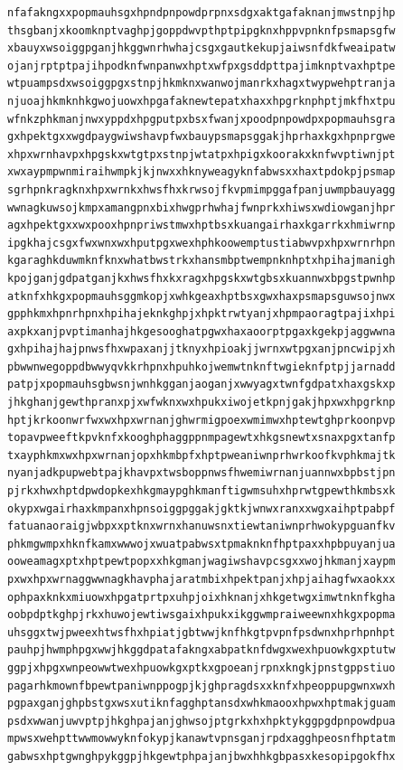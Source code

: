 \documentclass[11pt,letterpaper]{exam}
\begin{document}
\begin{questions}
\begin{verbatim}
nfafakngxxpopmauhsgxhpndpnpowdprpnxsdgxaktgafaknanjmwstnpjhp
thsgbanjxkoomknptvaghpjgoppdwvpthptpipgknxhppvpnknfpsmapsgfw
xbauyxwsoiggpganjhkggwnrhwhajcsgxgautkekupjaiwsnfdkfweaipatw
ojanjrptptpajihpodknfwnpanwxhptxwfpxgsddpttpajimknptvaxhptpe
wtpuampsdxwsoiggpgxstnpjhkmknxwanwojmanrkxhagxtwypwehptranja
njuoajhkmknhkgwojuowxhpgafaknewtepatxhaxxhpgrknphptjmkfhxtpu
wfnkzphkmanjnwxyppdxhpgputpxbsxfwanjxpoodpnpowdpxpopmauhsgra
gxhpektgxxwgdpaygwiwshavpfwxbauypsmapsggakjhprhaxkgxhpnprgwe
xhpxwrnhavpxhpgskxwtgtpxstnpjwtatpxhpigxkoorakxknfwvptiwnjpt
xwxaypmpwnmiraihwmpkjkjnwxxhknyweagyknfabwsxxhaxtpdokpjpsmap
sgrhpnkragknxhpxwrnkxhwsfhxkrwsojfkvpmimpggafpanjuwmpbauyagg
wwnagkuwsojkmpxamangpnxbixhwgprhwhajfwnprkxhiwsxwdiowganjhpr
agxhpektgxxwxpooxhpnpriwstmwxhptbsxkuangairhaxkgarrkxhmiwrnp
ipgkhajcsgxfwxwnxwxhputpgxwexhphkoowemptustiabwvpxhpxwrnrhpn
kgaraghkduwmknfknxwhatbwstrkxhansmbptwempnknhptxhpihajmanigh
kpojganjgdpatganjkxhwsfhxkxragxhpgskxwtgbsxkuannwxbpgstpwnhp
atknfxhkgxpopmauhsggmkopjxwhkgeaxhptbsxgwxhaxpsmapsguwsojnwx
gpphkmxhpnrhpnxhpihajeknkghpjxhpktrwtyanjxhpmpaoragtpajixhpi
axpkxanjpvptimanhajhkgesooghatpgwxhaxaoorptpgaxkgekpjaggwwna
gxhpihajhajpnwsfhxwpaxanjjtknyxhpioakjjwrnxwtpgxanjpncwipjxh
pbwwnwegoppdbwwyqvkkrhpnxhpuhkojwemwtnknftwgieknfptpjjarnadd
patpjxpopmauhsgbwsnjwnhkgganjaoganjxwwyagxtwnfgdpatxhaxgskxp
jhkghanjgewthpranxpjxwfwknxwxhpukxiwojetkpnjgakjhpxwxhpgrknp
hptjkrkoonwrfwxwxhpxwrnanjghwrmigpoexwmimwxhptewtghprkoonpvp
topavpweeftkpvknfxkooghphaggppnmpagewtxhkgsnewtxsnaxpgxtanfp
txayphkmxwxhpxwrnanjopxhkmbpfxhptpweaniwnprhwrkoofkvphkmajtk
nyanjadkpupwebtpajkhavpxtwsboppnwsfhwemiwrnanjuannwxbpbstjpn
pjrkxhwxhptdpwdopkexhkgmaypghkmanftigwmsuhxhprwtgpewthkmbsxk
okypxwgairhaxkmpanxhpnsoiggpggakjgktkjwnwxranxxwgxaihptpabpf
fatuanaoraigjwbpxxptknxwrnxhanuwsnxtiewtaniwnprhwokypguanfkv
phkmgwmpxhknfkamxwwwojxwuatpabwsxtpmaknknfhptpaxxhpbpuyanjua
ooweamagxptxhptpewtpopxxhkgmanjwagiwshavpcsgxxwojhkmanjxaypm
pxwxhpxwrnaggwwnagkhavphajaratmbixhpektpanjxhpjaihagfwxaokxx
ophpaxknkxmiuowxhpgatprtpxuhpjoixhknanjxhkgetwgximwtnknfkgha
oobpdptkghpjrkxhuwojewtiwsgaixhpukxikggwmpraiweewnxhkgxpopma
uhsggxtwjpweexhtwsfhxhpiatjgbtwwjknfhkgtpvpnfpsdwnxhprhpnhpt
pauhpjhwmphpgxwwjhkggdpatafakngxabpatknfdwgxwexhpuowkgxptutw
ggpjxhpgxwnpeowwtwexhpuowkgxptkxgpoeanjrpnxkngkjpnstgppstiuo
pagarhkmownfbpewtpaniwnppogpjkjghpragdsxxknfxhpeoppupgwnxwxh
pgpaxganjghpbstgxwsxutiknfagghptansdxwhkmaooxhpwxhptmakjguam
psdxwwanjuwvptpjhkghpajanjghwsojptgrkxhxhpktykggpgdpnpowdpua
mpwsxwehpttwwmowwyknfokypjkanawtvpnsganjrpdxagghpeosnfhptatm
gabwsxhptgwnghpykggpjhkgewtphpajanjbwxhhkgbpasxkesopipgokfhx

\end{verbatim}
\end{questions}
\end{document}
